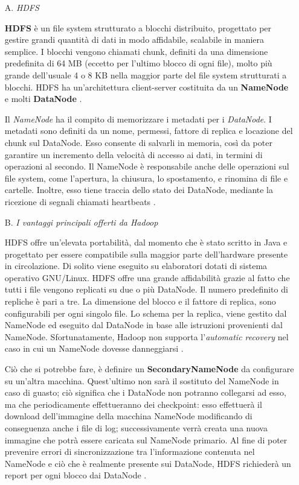 \documentclass[11pt]{article}
\begin{document}
\begin{enumerate}
	\item [A.]\emph{HDFS}
	
	\textbf{HDFS} è un file system strutturato a blocchi distribuito, progettato per gestire grandi quantità di dati in modo affidabile, scalabile in maniera semplice. I blocchi vengono chiamati chunk, definiti da una dimensione predefinita di 64 MB (eccetto per l'ultimo blocco di ogni file), molto più grande dell'usuale 4 o 8 KB nella maggior parte del file system strutturati a blocchi. HDFS ha un'architettura client-server costituita da un \textbf{NameNode} e molti \textbf{DataNode} \cite{hadoop}.
	
	Il \emph{NameNode} ha il compito di memorizzare i metadati per i \emph{DataNode}. I metadati sono definiti da un nome, permessi, fattore di replica e locazione del chunk sul DataNode. Esso consente di salvarli in memoria, così da poter garantire un incremento della velocità di accesso ai dati, in termini di operazioni al secondo. Il NameNode è responsabile anche delle operazioni sul file system, come l'apertura, la chiusura, lo spostamento, e rinomina di file e cartelle. Inoltre, esso tiene traccia dello stato dei DataNode, mediante la ricezione di segnali chiamati heartbeats \cite{hadoop}.
	
	\item [B.]\emph{I vantaggi principali offerti da Hadoop}
	
	HDFS offre un'elevata portabilità, dal momento che è stato scritto in Java e progettato per essere compatibile sulla maggior parte dell'hardware presente in circolazione. Di solito viene eseguito su elaboratori dotati di sistema operativo GNU/Linux. HDFS offre una grande affidabilità grazie al fatto che tutti i file vengono replicati su due o più DataNode. Il numero predefinito di repliche è pari a tre. La dimensione del blocco e il fattore di replica, sono configurabili per ogni singolo file. Lo schema per la replica, viene gestito dal NameNode ed eseguito dal DataNode in base alle istruzioni provenienti dal NameNode. Sfortunatamente, Hadoop non supporta l'\emph{automatic recovery} nel caso in cui un NameNode dovesse danneggiarsi \cite{hadoop}. 
	
	Ciò che si potrebbe fare, è definire un \textbf{SecondaryNameNode} da configurare su un'altra macchina. Quest'ultimo non sarà il sostituto del NameNode in caso di guasto; ciò significa che i DataNode non potranno collegarsi ad esso, ma che periodicamente effettueranno dei checkpoint: esso effettuerà il download dell'immagine della macchina NameNode modificando di conseguenza anche i file di log; successivamente verrà creata una nuova immagine che potrà essere caricata sul NameNode primario. Al fine di poter prevenire errori di sincronizzazione tra l'informazione contenuta nel NameNode e ciò che è realmente presente sui DataNode, HDFS richiederà un report per ogni blocco dai DataNode \cite{hadoop}.
	

\end{enumerate}
\end{document}

